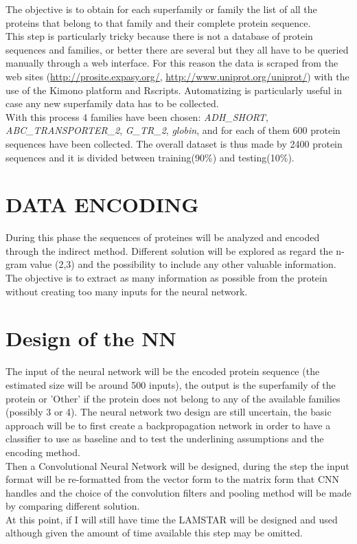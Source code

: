 \documentclass[a4paper, 10pt, conference]{ieeeconf}      %
\begin{document}
	The objective is to obtain for each superfamily or family the list of all the proteins that belong to that family and their complete protein sequence.\\
	This step is particularly tricky because there is not a database of protein sequences and families, or better there are several but they all have to be queried manually through a web interface. For this reason the data is scraped from the web sites (\href{http://prosite.expasy.org/}{http://prosite.expasy.org/}, \href{http://www.uniprot.org/uniprot/}{http://www.uniprot.org/uniprot/}) with the use of the Kimono platform\cite{kimono} and Rscripts. Automatizing is particularly useful in case any new superfamily data has to be collected.\\
	With this process 4 families have been chosen: \textit{ADH\_SHORT},\textit{ ABC\_TRANSPORTER\_2}, \textit{G\_TR\_2}, \textit{globin}, and for each of them 600 protein sequences have been collected. The overall dataset is thus made by 2400 protein sequences and it is divided between training(90\%) and testing(10\%).
\section{DATA ENCODING}\label{sec:encoding}
	During this phase the sequences of proteines will be analyzed and encoded through the indirect method. Different solution will be explored as regard the n-gram value (2,3) and the possibility to include any other valuable information. The objective is to extract as many information as possible from the protein without creating too many inputs for the neural network.
\section{Design of the NN}
	The input of the neural network will be the encoded protein sequence (the estimated size will be around 500 inputs), the output is the superfamily of the protein or 'Other' if the protein does not belong to any of the available families (possibly 3 or 4).
	The neural network two design are still uncertain, the basic approach will be to first create a backpropagation network in order to have a classifier to use as baseline and to test the underlining assumptions and the encoding method.\\
	Then a Convolutional Neural Network will be designed, during the step the input format will be re-formatted from the vector form to the matrix form that CNN handles and the choice of the convolution filters and pooling method will be made by comparing different solution.\\
	At this point, if I will still have time the LAMSTAR will be designed and used although given the amount of time available this step may be omitted.
\end{document}
